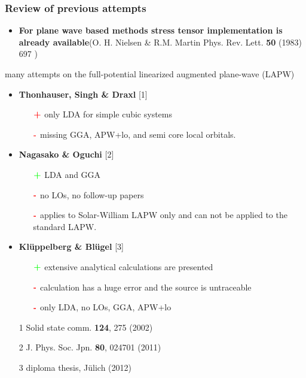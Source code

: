 \documentclass[10pt, handout]{beamer}
\begin{document}
\begin{frame}
\frametitle{Review of previous attempts}

\begin{itemize}
	\item \textbf{For plane wave based methods stress tensor implementation is already available}(\tiny{O. H. Nielsen \& R.M. Martin Phys. Rev. Lett. \textbf{50} (1983) 697} )
\end{itemize}

  many attempts on the full-potential linearized augmented plane-wave (LAPW) 

\begin{itemize}
	\item \textbf{Thonhauser, Singh \& Draxl} [1]
	\begin{itemize}
			\item [$\color{red}{\textbf{+}}$] only LDA for simple cubic systems
			\item [$\color{red}{\textbf{-}}$] missing GGA, APW+lo, and semi core local orbitals.
		\end{itemize}
	\item \textbf{Nagasako \& Oguchi} [2]
	\begin{itemize}
			\item [$\color{green}{\textbf{+}}$] LDA and GGA 
			\item [$\color{red}{\textbf{-}}$] no LOs, no follow-up papers
			\item [$\color{red}{\textbf{-}}$] applies to Solar-William LAPW only and can not be applied to the standard LAPW.
		\end{itemize}
	\item \textbf{Kl\"uppelberg \& Bl\"ugel} [3]
	\begin{itemize}
			\item [$\color{green}{\textbf{+}}$] extensive analytical calculations are presented
			\item [$\color{red}{\textbf{-}}$] calculation has a huge error and the source is untraceable
			\item [$\color{red}{\textbf{-}}$] only LDA, no LOs, GGA, APW+lo
		\end{itemize}
\end{itemize}

\vspace{-0.01mm}

{\tiny
		\begin{itemize}
				\item [1] Solid state comm. \textbf{124}, 275 (2002)
				\item [2] J. Phys. Soc. Jpn. \textbf{80}, 024701 (2011)
				\item [3] diploma thesis, J\"ulich (2012)
			\end{itemize}
	}	

\end{frame}
\end{document}
